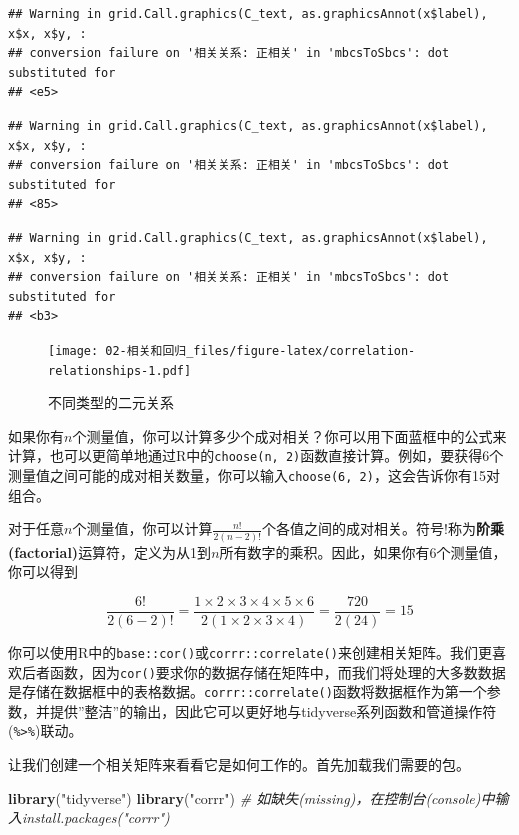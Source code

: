 \documentclass[
]{book}
\newenvironment{Shaded}{\begin{snugshade}}{\end{snugshade}}
\newcommand{\CommentTok}[1]{\textcolor[rgb]{0.56,0.35,0.01}{\textit{#1}}}
\newcommand{\FunctionTok}[1]{\textcolor[rgb]{0.13,0.29,0.53}{\textbf{#1}}}
\newcommand{\NormalTok}[1]{#1}
\newcommand{\StringTok}[1]{\textcolor[rgb]{0.31,0.60,0.02}{#1}}
\begin{document}
\begin{verbatim}
## Warning in grid.Call.graphics(C_text, as.graphicsAnnot(x$label), x$x, x$y, :
## conversion failure on '相关关系: 正相关' in 'mbcsToSbcs': dot substituted for
## <e5>
\end{verbatim}

\begin{verbatim}
## Warning in grid.Call.graphics(C_text, as.graphicsAnnot(x$label), x$x, x$y, :
## conversion failure on '相关关系: 正相关' in 'mbcsToSbcs': dot substituted for
## <85>
\end{verbatim}

\begin{verbatim}
## Warning in grid.Call.graphics(C_text, as.graphicsAnnot(x$label), x$x, x$y, :
## conversion failure on '相关关系: 正相关' in 'mbcsToSbcs': dot substituted for
## <b3>
\end{verbatim}

\begin{figure}
\centering
\texttt{[image: 02-相关和回归\_files/figure-latex/correlation-relationships-1.pdf]}
\caption{\label{fig:correlation-relationships}不同类型的二元关系}
\end{figure}

如果你有\(n\)个测量值，你可以计算多少个成对相关？你可以用下面蓝框中的公式来计算，也可以更简单地通过R中的\texttt{choose(n,\ 2)}函数直接计算。例如，要获得6个测量值之间可能的成对相关数量，你可以输入\texttt{choose(6,\ 2)}，这会告诉你有15对组合。

对于任意\(n\)个测量值，你可以计算\(\frac{n!}{2(n - 2)!}\)个各值之间的成对相关。符号\(!\)称为\textbf{阶乘(factorial)}运算符，定义为从1到\(n\)所有数字的乘积。因此，如果你有6个测量值，你可以得到

\[
\frac{6!}{2(6-2)!} = \frac{1 \times 2 \times 3 \times 4 \times 5 \times 6}{2\left(1 \times 2 \times 3 \times 4\right)} = \frac{720}{2(24)} = 15
\]

你可以使用R中的\texttt{base::cor()}或\texttt{corrr::correlate()}来创建相关矩阵。我们更喜欢后者函数，因为\texttt{cor()}要求你的数据存储在矩阵中，而我们将处理的大多数数据是存储在数据框中的表格数据。\texttt{corrr::correlate()}函数将数据框作为第一个参数，并提供''整洁''的输出，因此它可以更好地与tidyverse系列函数和管道操作符(\texttt{\%\textgreater{}\%})联动。

让我们创建一个相关矩阵来看看它是如何工作的。首先加载我们需要的包。

\begin{Shaded}
\begin{Highlighting}[]
\FunctionTok{library}\NormalTok{(}\StringTok{"tidyverse"}\NormalTok{)}
\FunctionTok{library}\NormalTok{(}\StringTok{"corrr"}\NormalTok{)  }\CommentTok{\# 如缺失(missing)，在控制台(console)中输入install.packages("corrr")}
\end{Highlighting}
\end{Shaded}
\end{document}
